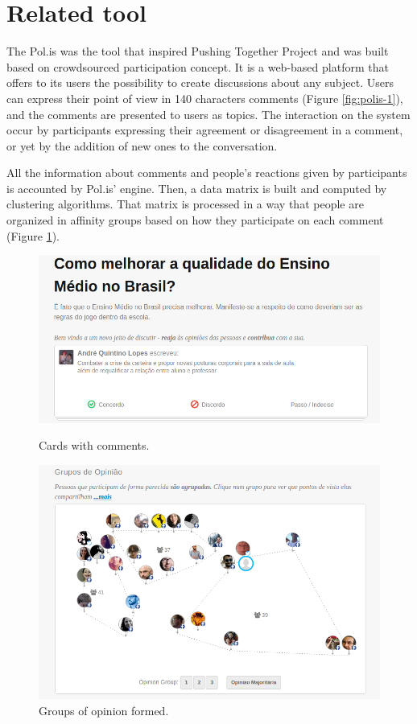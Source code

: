 \documentclass{llncs}
\begin{document}
\section{Related tool}

  The Pol.is was the tool that inspired Pushing Together Project and
was built based on crowdsourced participation concept.
It is a web-based platform that offers to its users the possibility to
create discussions about any subject. Users can express their point of view in
140 characters comments (Figure \ref{fig:polis-1}), and the comments are presented
to users as topics. The interaction on the system occur by
participants expressing their agreement or disagreement in a comment, or yet by
the addition of new ones to the conversation.

  All the information about comments and people's reactions given by participants
is accounted by Pol.is' engine.
Then, a data matrix is built and computed by clustering algorithms. That matrix
is processed in
a way that people are organized in affinity groups based on how they participate
on each comment (Figure \ref{fig:polis-2}).

 \begin{figure}[hbt]
   \centering
   \begin{minipage}{.50\textwidth}
     \includegraphics[width=.9\linewidth]{images/polis1.png}
     \caption{Cards with comments.}
     \label{fig:polis-1}
   \end{minipage}
   \begin{minipage}{.49\textwidth}
     \includegraphics[width=.9\linewidth]{images/polis2.png}
     \caption{Groups of opinion formed.}
     \label{fig:polis-2}
   \end{minipage}
 \end{figure}
\end{document}
